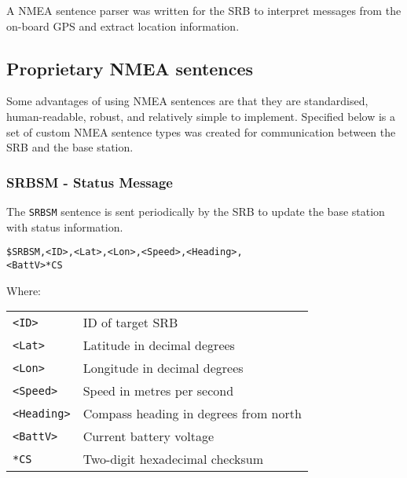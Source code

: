 \documentclass[a4paper]{IEEEtran}
\newenvironment{nmeaspec}[1]
{
\newcommand{\field}[2]{\texttt{##1} & ##2 \\}
\vspace{0.2cm}
\noindent\texttt{#1}
\vspace{0.2cm}

\noindent Where: \vspace{0.1cm}\\  \noindent
\vspace{0.2cm}
\begin{tabular}{ll}
}
{
\end{tabular}
}
\begin{document}
A NMEA sentence parser was written for the SRB to interpret messages from the on-board GPS and extract location information.

\subsection{Proprietary NMEA sentences}
Some advantages of using NMEA sentences are that they are standardised, human-readable, robust, and relatively simple to implement. Specified below is a set of custom NMEA sentence types was created for communication between the SRB and the base station.

\subsubsection{SRBSM - Status Message}
The \texttt{SRBSM} sentence is sent periodically by the SRB to update the base station with status information.

\begin{nmeaspec}{\$SRBSM,<ID>,<Lat>,<Lon>,<Speed>,<Heading>,\\<BattV>*CS}
\field{<ID>}{ID of target SRB}
\field{<Lat>}{Latitude in decimal degrees}
\field{<Lon>}{Longitude in decimal degrees}
\field{<Speed>}{Speed in metres per second}
\field{<Heading>}{Compass heading in degrees from north}
\field{<BattV>}{Current battery voltage}
\field{*CS}{Two-digit hexadecimal checksum}
\end{nmeaspec}



\end{document}
